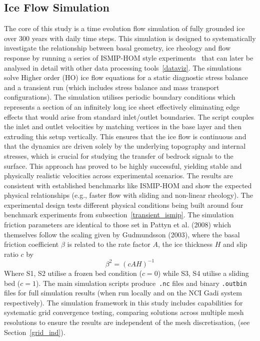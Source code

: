 \subsection{Ice Flow Simulation}
The core of this study is a time evolution flow simulation of fully grounded ice over 300 years with daily time steps. This simulation is designed to systematically investigate the relationship between basal geometry, ice rheology and flow response by running a series of ISMIP-HOM style experiments~\cite{Pattyn_2008} that can later be analysed in detail with other data processing tools~\ref{dataviz}. The simulations solve Higher order (HO) ice flow equations for a static diagnostic stress balance and a transient run (which includes stress balance and mass transport configurations).
The simulation utilises periodic boundary conditions which represents a section of an infinitely long ice sheet effectively eliminating edge effects that would arise from standard inlet/outlet boundaries. The script couples the inlet and outlet velocities by matching vertices in the base layer and then extruding this setup vertically. This ensures that the ice flow is continuous and that the dynamics are driven solely by the underlying topography and internal stresses, which is crucial for studying the transfer of bedrock signals to the surface.
This approach has proved to be highly successful, yielding stable and physically realistic velocities across experimental scenarios. The results are consistent with established benchmarks like ISMIP-HOM and show the expected physical relationships (e.g., faster flow with sliding and non-linear rheology).
The experimental design tests different physical conditions being built around four benchmark experiments from subsection~\ref{transient_ismip}.  
The simulation friction parameters are identical to those set in Pattyn et al. (2008) which themselves follow the scaling given by Gudmundsson (2003), where the basal friction coefficient $\beta$ is related to the rate factor $A$, the ice thickness $H$ and slip ratio $c$ by
\begin{equation}
\beta^2 = \left (c A H\right )^{-1}
\end{equation}
Where S1, S2 utilise a frozen bed condition ($c = 0$) while S3, S4 utilise a sliding bed ($c = 1$).
The main simulation scripts produce~\texttt{.nc} files and binary \texttt{.outbin} files for full simulation results (when run locally and on the NCI Gadi system respectively).
The simulation framework in this study includes capabilities for systematic grid convergence testing, comparing solutions across multiple mesh resolutions to ensure the results are independent of the mesh discretisation, (see Section~\ref{grid_ind}).
\newpage
